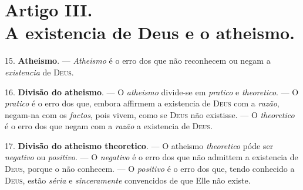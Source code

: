 

\section*{Artigo III.\\ A existencia de Deus e o atheismo.}

15. \textbf{Atheismo}. --- \emph{Atheismo} é o erro dos que não reconhecem ou negam a \emph{existencia} de \textsc{Deus}.

16. \textbf{Divisão do atheismo}. --- O \emph{atheismo} divide-se em \emph{pratico} e \emph{theoretico}. --- O \emph{pratico} é o erro dos que, embora affirmem a existencia de \textsc{Deus} com a \emph{razão}, negam-na com os \emph{factos}, pois vivem, como se \textsc{Deus} não existisse. --- O \emph{theoretico} é o erro dos que negam com a \emph{razão} a existencia de \textsc{Deus}.

17. \textbf{Divisão do atheismo theoretico}. --- O atheismo \emph{theoretico} póde ser \emph{negativo} ou \emph{positivo}. --- O \emph{negativo} é o erro dos que não admittem a existencia de \textsc{Deus}, porque o não conhecem. --- O \emph{positivo} é o erro dos que, tendo conhecido a \textsc{Deus}, estão \emph{séria} e \emph{sinceramente} convencidos de que Elle não existe.
